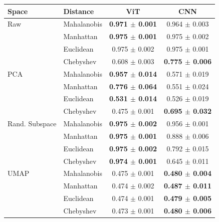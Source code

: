 \begin{tabular}{llcc}
\toprule
Space & Distance & ViT & CNN \\
\midrule
Raw & Mahalanobis & \textbf{0.971 $\pm$ 0.001} & 0.964 $\pm$ 0.003 \\
 & Manhattan & \textbf{0.975 $\pm$ 0.001} & 0.975 $\pm$ 0.002 \\
 & Euclidean & 0.975 $\pm$ 0.002 & 0.975 $\pm$ 0.001 \\
 & Chebyshev & 0.608 $\pm$ 0.003 & \textbf{0.775 $\pm$ 0.006} \\
\midrule
PCA & Mahalanobis & \textbf{0.957 $\pm$ 0.014} & 0.571 $\pm$ 0.019 \\
 & Manhattan & \textbf{0.776 $\pm$ 0.064} & 0.551 $\pm$ 0.024 \\
 & Euclidean & \textbf{0.531 $\pm$ 0.014} & 0.526 $\pm$ 0.019 \\
 & Chebyshev & 0.475 $\pm$ 0.001 & \textbf{0.695 $\pm$ 0.032} \\
\midrule
Rand. Subspace & Mahalanobis & \textbf{0.975 $\pm$ 0.002} & 0.956 $\pm$ 0.001 \\
 & Manhattan & \textbf{0.975 $\pm$ 0.001} & 0.888 $\pm$ 0.006 \\
 & Euclidean & \textbf{0.975 $\pm$ 0.002} & 0.792 $\pm$ 0.015 \\
 & Chebyshev & \textbf{0.974 $\pm$ 0.001} & 0.645 $\pm$ 0.011 \\
\midrule
UMAP & Mahalanobis & 0.475 $\pm$ 0.001 & \textbf{0.480 $\pm$ 0.004} \\
 & Manhattan & 0.474 $\pm$ 0.002 & \textbf{0.487 $\pm$ 0.011} \\
 & Euclidean & 0.474 $\pm$ 0.001 & \textbf{0.479 $\pm$ 0.005} \\
 & Chebyshev & 0.473 $\pm$ 0.001 & \textbf{0.480 $\pm$ 0.006} \\

\bottomrule
\end{tabular}